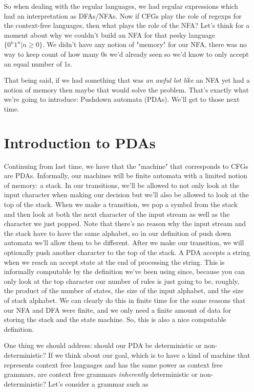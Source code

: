 \documentclass[11pt]{article}
\begin{document}
So when dealing with the regular languages, we had regular expressions which had an interpretation as DFAs/NFAs. Now if CFGs play the role of regexps for the context-free languages, then what plays the role of the NFA? Let's think for a moment about why we couldn't build an NFA for that pesky language  $\{0^n1^n | n \geq 0\}$. We didn't have any notion of "memory" for our NFA, there was no way to keep count of how many 0s we'd already seen so we'd know to only accept an equal number of 1s.

That being said, if we had something that was \emph{an awful lot like} an NFA yet had a notion of memory then maybe that would solve the problem. That's exactly what we're going to introduce: Pushdown automata (PDAs). We'll get to those next time.
\section{Introduction to PDAs}
\label{sec-8}
Continuing from last time, we have that the "machine" that corresponds to CFGs are PDAs. Informally, our machines will be finite automata with a limited notion of memory: a stack. In our transitions, we'll be allowed to not only look at the input character when making our decision but we'll also be allowed to look at the top of the stack. When we make a transition, we pop a symbol from the stack and then look at both the next character of the input stream as well as the character we just popped. Note that there's no reason why the input stream and the stack have to have the same alphabet, so in our definition of push down automata we'll allow them to be different. After we make our transition, we will optionally push another character to the top of the stack. A PDA accepts a string when we reach an accept state at the end of processing the string. This is informally computable by the definition we've been using since, because you can only look at the top character our number of rules is just going to be, roughly, the product of the number of states, the size of the input alphabet, and the size of stack alphabet. We can clearly do this in finite time for the same reasons that our NFA and DFA were finite, and we only need a finite amount of data for storing the stack and the state machine. So, this is also a nice computable definition.

One thing we should address: should our PDA be deterministic or non-deterministic? If we think about our goal, which is to have a kind of machine that represents context free languages and has the same power as context free grammars, are context free grammars \emph{inherently} deterministic or non-deterministic? Let's consider a grammar such as
\end{document}
